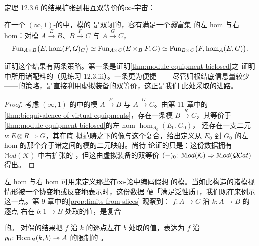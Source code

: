 定理 12.3.6 的结果扩张到相互双等价的∞-宇宙：

\begin{corollary}\label{cor:module-equipment-biclosed-cosmos}
在一个 $(\infty,1)$-\trCategory{}的\trInfinityCosmos{}中，模的%
\trVirtualEquipment{}是双闭的，容有满足一个\emph{弱}富集\trUniversalProperty{}%
的左 hom 与右 hom：对模
$A\xrightarrow{E}B$、$B\xrightarrow{F}C$ 与 $A\xrightarrow{G}C$，
\[
\operatorname{Fun}_{A\times B}\bigl(E,\hom(F,G)_{C}\bigr)\simeq
\operatorname{Fun}_{A\times C}(E\times_{B}F,G)\simeq
\operatorname{Fun}_{B\times C}\bigl(F,\hom_{A}(E,G)\bigr).
\]
\end{corollary}

证明这个结果有两条策略。第一条是证明\cref{thm:module-equipment-biclosed}之
证明中所用诸配料的\trModelIndependence（见练习 12.3.iii）。一条更为便捷——
尽管归根结底信息量较少——的策略，是直接利用虚拟装备的双等价，这正是我们
此处采取的进路。

\begin{proof}
考虑 $(\infty,1)$-\trCategory{}的\trInfinityCosmos{}中的模
$A\xrightarrow{E}B$ 与 $A\xrightarrow{G}C$。由第 11 章中的%
\cref{thm:biequivalence-of-virtual-equipments}，存在一条模
$B\xrightarrow{R}C$，其\trUnderlyingQuasiCategory{}等价于%
\cref{thm:module-equipment-biclosed}的左 hom $\hom_{A_{0}}(E_{0},G_{0})$，
还存在一支二元\trCell{} $\nu\colon E\otimes R\Rightarrow G$，其在底
拟范畴\trFunctor{}之下的像与这个\trEquivalence{}复合，给出定义从 $E_{0}$ 到
$G_{0}$ 的左 hom 的那个介于诸\trQuasiCategory{}之间的模的二元映射。尚待
论证的只是：这份数据拥有 $\mathbb{M}od(\mathcal{K})$ 中右扩张的%
\trUniversalProperty，但这由虚拟装备的双等价
$(-)_{0}\colon\mathbb{M}od(\mathcal{K})\Rightarrow\mathbb{M}od(\mathcal{Q}\mathcal{C}at)$ 得出。
\end{proof}

左 hom 与右 hom 可用来定义那些在∞-\trCategory{}论中编码假想\trUniversalProperty{}%
的模。当如此构造的诸模视情形被一个\trFunctor{}协变地或反变地表示时，这份数据
便「满足泛性质」，我们现在来例示这一点。第 9 章中的\cref{prop:limits-from-slices}
观察到：\trFunctor{} $f\colon A\to C$ 沿\trFunctor{} $k\colon A\to B$ 的逐点
右\trExtension{}在\trElement{} $b\colon 1\to B$ 处取的值，是复合\trDiagram
\begin{center}
\end{center}
的\trLimit。
对偶的结果把 $f$ 沿 $k$ 的逐点左\trExtension{}在 $b$ 处取的值，表达为%
\trFunctor{} $f$ 沿 $p_{0}\colon\mathrm{Hom}_{B}(k,b)\twoheadrightarrow A$ 的限制的%
\trColimit。

